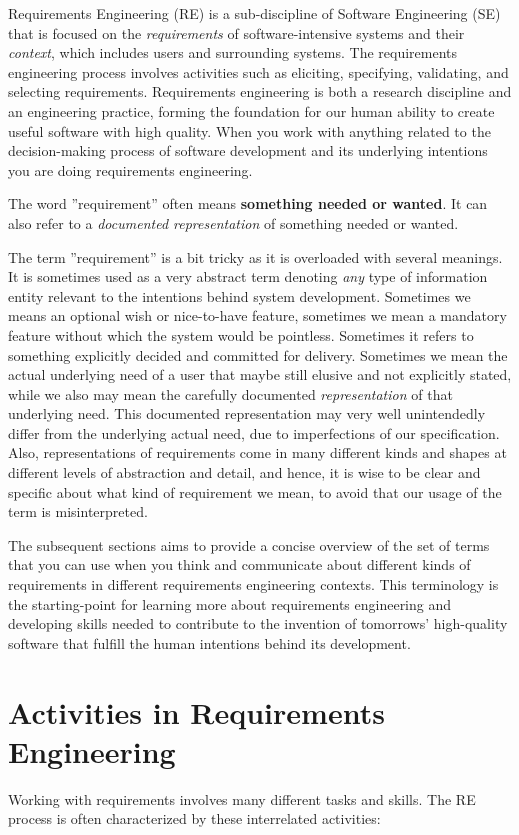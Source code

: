 Requirements Engineering (RE) is a sub-discipline of Software Engineering (SE) that is focused on the \textit{requirements} of software-intensive systems and their \textit{context}, which includes users and surrounding systems. 
The requirements engineering process involves activities such as eliciting, specifying, validating, and selecting requirements. 
Requirements engineering is both a research discipline and an engineering practice, forming the foundation for our human ability to create useful software with high quality. When you work with anything related to the decision-making process of software development and its underlying intentions you are doing requirements engineering.  

The word ''requirement'' often means \textbf{something needed or wanted}. It can also refer to a \emph{documented representation} of something needed or wanted. 

The term ''requirement'' is a bit tricky as it is overloaded with several meanings. It is sometimes used as a very abstract term denoting \textit{any} type of information entity relevant to the intentions behind system development.  Sometimes we means an optional wish or nice-to-have feature, sometimes we mean a mandatory feature without which the system would be pointless. Sometimes it refers to something explicitly decided and committed for delivery. Sometimes we mean the actual underlying need of a user that maybe still elusive and not explicitly stated, while we also may mean the carefully documented \textit{representation} of that underlying need. This documented representation may very well unintendedly differ from the underlying actual need, due to imperfections of our specification. 
Also, representations of requirements come in many different kinds and shapes at different levels of abstraction and detail, and hence, it is wise to be clear and specific about what kind of requirement we mean, to avoid that our usage of the term is misinterpreted. 

The subsequent sections aims to provide a concise overview of the set of terms that you can use when you think and communicate about different kinds of requirements in different requirements engineering contexts. This terminology is the starting-point for learning more about requirements engineering and developing skills needed to contribute to the invention of tomorrows' high-quality software that fulfill the human intentions behind its development.

\section{Activities in Requirements Engineering}
Working with requirements involves many different tasks and skills. The RE process is often characterized by these interrelated activities: 

